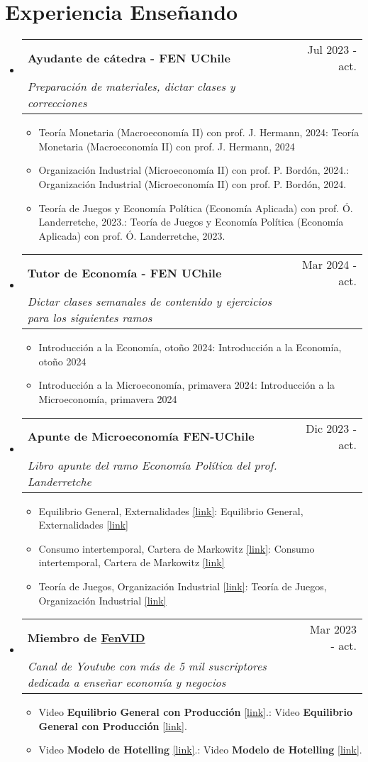 \documentclass[letterpaper,12pt]{article}
\makeatletter
\def \ifempty#1{\def\temp{#1} \ifx\temp\empty }
\newcommand{\resumeItem}[2]{
  \item\small{
  	\ifempty{#1}#2\else\textbf{#1}{: #2 \vspace{-2pt}}\fi
  }
}
\newcommand{\resumeSubheading}[4]{
  \vspace{-1pt}\item
    \begin{tabular*}{0.97\textwidth}{l@{\extracolsep{\fill}}r}
      \textbf{#1} & #2 \\
      \textit{\small#3} & \textit{\small #4} \\
    \end{tabular*}\vspace{-5pt}
}
\newcommand{\resumeSubHeadingListStart}{\begin{itemize}[leftmargin=*]}
\newcommand{\resumeSubHeadingListEnd}{\end{itemize}}
\newcommand{\resumeItemListStart}{\begin{itemize}}
\newcommand{\resumeItemListEnd}{\end{itemize}\vspace{-5pt}}
\makeatother
\begin{document}
\section{Experiencia Enseñando}
 \resumeSubHeadingListStart
    \resumeSubheading
      {Ayudante de cátedra - FEN UChile}{Jul 2023 - act.}
      {Preparación de materiales, dictar clases y correcciones}{}
      \resumeItemListStart
        \resumeItem{}
            {Teoría Monetaria (Macroeconomía II) con prof. J. Hermann, 2024} 
        \resumeItem{}
            {Organización Industrial (Microeconomía II) con prof. P. Bordón, 2024.}
        \resumeItem{}
            {Teoría de Juegos y Economía Política (Economía Aplicada) con prof. Ó. Landerretche, 2023.}
        \resumeItemListEnd
            \resumeSubheading
      {Tutor de Economía - FEN UChile}{Mar 2024 - act.}
      {Dictar clases semanales de contenido y ejercicios para los siguientes ramos}{}
      \resumeItemListStart
        \resumeItem{}
            {Introducción a la Economía, otoño 2024} 
        \resumeItem{}
            {Introducción a la Microeconomía, primavera 2024} 
        \resumeItemListEnd
        \resumeSubheading
      {Apunte de Microeconomía FEN-UChile}{Dic 2023 - act.}
      {Libro apunte del ramo Economía Política del prof. Landerretche}{}
      \resumeItemListStart
        \resumeItem{}
            {Equilibrio General, Externalidades \href{https://drive.google.com/file/d/1qSG7litPMbgApps3xh6Wg8E2oBEdpS2Q/view?usp=sharing}{[\underline{link}]}} 
        \resumeItem{}
            {Consumo intertemporal, Cartera de Markowitz \href{https://drive.google.com/file/d/1dwklCvntSaiwPb76ITg9tiqVT4nx9nH2/view?usp=share_link}{[\underline{link}]}} 
        \resumeItem{}
            {Teoría de Juegos, Organización Industrial \href{https://drive.google.com/file/d/1RzAVmewzf7UsY4Zq4kz8vZbv48XZDNRd/view?usp=share_link}{[\underline{link}]}} 
        \resumeItemListEnd
    \resumeSubheading
      {Miembro de \href{https://www.youtube.com/@FENVidUchile}{FenVID}}{Mar 2023 - act.}
      {Canal de Youtube con más de 5 mil suscriptores dedicada a enseñar economía y negocios}{}
      \resumeItemListStart
        \resumeItem{}
            {Video \textbf{Equilibrio General con Producción} \href{https://youtu.be/NgxHDSLMPbo?si=gaVw4cDE1Kq89EQ_}{[\underline{link}]}.}
        \resumeItem{}
            {Video \textbf{Modelo de Hotelling} \href{https://youtu.be/p7UcJlSK_qY?si=CecJ5Q1rEyIp3g2C}{[\underline{link}]}.}
        \resumeItemListEnd
        
\resumeSubHeadingListEnd
\end{document}
